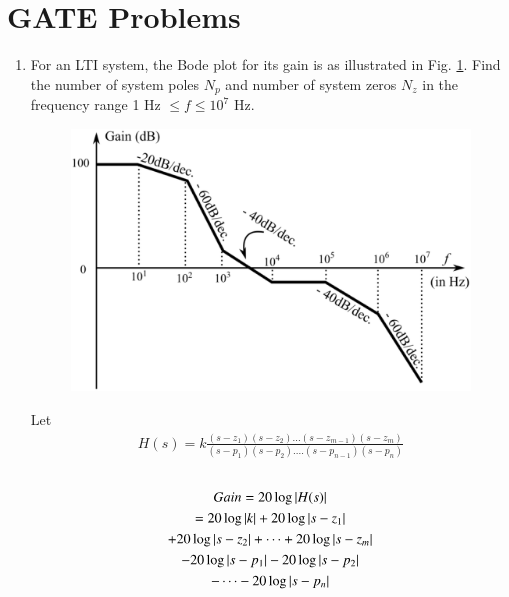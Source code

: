 \documentclass[journal,12pt,twocolumn]{IEEEtran}
\renewcommand\thesection{\arabic{section}}
\begin{document}
\section{GATE Problems}
\begin{enumerate}[label=\arabic*.,ref=\thesection.\theenumi]
\item
For an LTI system, the Bode plot for its gain is as illustrated in Fig. \ref{fig:galaxy}. Find the number of system poles $N_{p}$ and number of system zeros $N_{z}$ in the frequency range 1 Hz $\leq f \leq 10^{7}$ Hz. 

\begin{figure}[!h]
    \centering
    \includegraphics[width=\columnwidth]{./figs/figure.eps}
\caption{}
      \label{fig:galaxy}
\end{figure}
\solution
Let
\begin{align}
H(s) = k \frac{(s-z_{1})(s-z_{2})...(s-z_{m-1})(s-z_{m})}{(s-p_{1})(s-p_{2})....(s-p_{n-1})(s-p_{n})}
\end{align}
\\
\begin{multline}
Gain = 20\log\left\vert H(s)\right\vert 
\\
= 20\log\left\vert k\right\vert + 20\log\left\vert s-z_{1}\right\vert 
\\
+ 20\log\left\vert s-z_{2}\right\vert + \dots + 20\log\left\vert s-z_{m}\right\vert 
\\
- 20\log\left\vert s-p_{1}\right\vert - 20\log\left\vert s-p_{2}\right\vert 
\\
-\dots - 20\log\left\vert s-p_{n}\right\vert 
\end{multline}


\end{enumerate}
\end{document}
